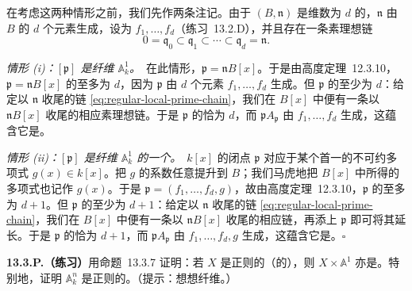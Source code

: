 在考虑这两种情形之前，我们先作两条注记。由于 $(B,\mathfrak{n})$ 是维数为 $d$ 的\trRegular\trLocalRing，$\mathfrak{n}$ 由 $B$ 的 $d$ 个元素生成，设为 $f_1,\dots,f_d$（\mbox{练习~13.2.D}），并且存在一条素理想链
\begin{equation*}\tag{13.3.7.1}\label{eq:regular-local-prime-chain}
0=\mathfrak{q}_0\subset\mathfrak{q}_1\subset\cdots\subset\mathfrak{q}_d=\mathfrak{n}.
\end{equation*}

\emph{情形 (i)：$[\mathfrak{p}]$ 是纤维 $\mathbb{A}^1_k$。}\ 在此情形，$\mathfrak{p}=\mathfrak{n}B[x]$。于是由\trKrull{}高度定理~12.3.10，$\mathfrak{p}=\mathfrak{n}B[x]$ 的\trCodimension{}至多为 $d$，因为 $\mathfrak{p}$ 由 $d$ 个元素 $f_1,\dots,f_d$ 生成。但 $\mathfrak{p}$ 的\trCodimension{}至少为 $d$：给定以 $\mathfrak{n}$ 收尾的链 \eqref{eq:regular-local-prime-chain}，我们在 $B[x]$ 中便有一条以 $\mathfrak{n}B[x]$ 收尾的相应素理想链。于是 $\mathfrak{p}$ 的\trCodimension{}恰为 $d$，而 $\mathfrak{p}A_{\mathfrak{p}}$ 由 $f_1,\dots,f_d$ 生成，这蕴含它是\trRegular\trLocalRing。

\emph{情形 (ii)：$[\mathfrak{p}]$ 是纤维 $\mathbb{A}^1_k$ 的一个\trClosedPoint。}\ $k[x]$ 的闭点 $\mathfrak{p}$ 对应于某个首一的不可约多项式 $g(x)\in k[x]$。把 $g$ 的系数任意提升到 $B$；我们马虎地把 $B[x]$ 中所得的多项式也记作 $g(x)$。于是 $\mathfrak{p}=(f_1,\dots,f_d,g)$，故由\trKrull{}高度定理~12.3.10，$\mathfrak{p}$ 的\trCodimension{}至多为 $d+1$。但 $\mathfrak{p}$ 的\trCodimension{}至少为 $d+1$：给定以 $\mathfrak{n}$ 收尾的链 \eqref{eq:regular-local-prime-chain}，我们在 $B[x]$ 中便有一条以 $\mathfrak{n}B[x]$ 收尾的相应链，再添上 $\mathfrak{p}$ 即可将其延长。于是 $\mathfrak{p}$ 的\trCodimension{}恰为 $d+1$，而 $\mathfrak{p}A_{\mathfrak{p}}$ 由 $f_1,\dots,f_d,g$ 生成，这蕴含它是\trRegular\trLocalRing。\hfill$\square$

\textbf{13.3.P.（练习）}\quad 用命题~13.3.7 证明：若 $X$ 是正则的（\trLocally\trNoetherian{}的）\trScheme，则 $X\times\mathbb{A}^1$ 亦是。特别地，证明 $\mathbb{A}^n_k$ 是正则的。（提示：想想纤维。）
